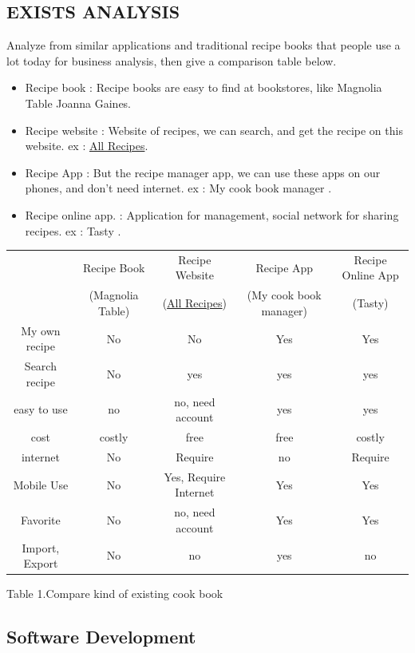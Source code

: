 \documentclass{article}
\begin{document}
\subsection{EXISTS ANALYSIS}
\qquad Analyze from similar applications and traditional recipe books that people use a lot today for business analysis, then give a comparison table below.
\begin{itemize}
\item Recipe book : Recipe books are easy to find at bookstores, like Magnolia Table Joanna Gaines.
\item Recipe website : Website of recipes, we can search, and get the recipe on this website. ex : \href{https://allrecipes.com}{All Recipes}.
\item Recipe App : But the recipe manager app, we can use these apps on our phones, and don't need internet. ex : My cook book manager .
\item Recipe online app. : Application for management, social network for sharing recipes. ex : Tasty .
\end{itemize}
\begin{center}
 \begin{tabular}{||c c c c c||} 
 \hline
  & Recipe Book & Recipe Website & Recipe App & Recipe Online App \\ [0.5ex] 
  & (Magnolia Table) & (\href{https://allrecipes.com}{All Recipes}) & (My cook book manager) & (Tasty) \\ [0.5ex] 
 \hline\hline
My own recipe & No & No & Yes & Yes \\ 
 \hline
 Search recipe & No & yes & yes & yes \\
 \hline
 easy to use & no & no, need account & yes & yes \\
 \hline
 cost & costly & free & free &  costly\\
 \hline
 internet & No & Require & no & Require \\ [1ex] 
 \hline
 Mobile Use & No & Yes, Require Internet & Yes & Yes \\ [1ex] 
  \hline
 Favorite & No & no, need account & Yes & Yes \\ [1ex] 
 \hline
  Import, Export & No & no & yes & no \\ [1ex] 
 \hline
\end{tabular}
\caption{Table 1.Compare kind of existing cook book}
\end{center}
\newpage
\subsection{Software Development}
\end{document}
